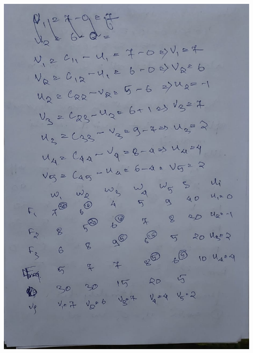 \documentclass[12pt, letterpaper, twoside]{book}
\begin{document}
\includegraphics[width=\paperwidth, height=\paperheight]{Page8}
\end{document}
